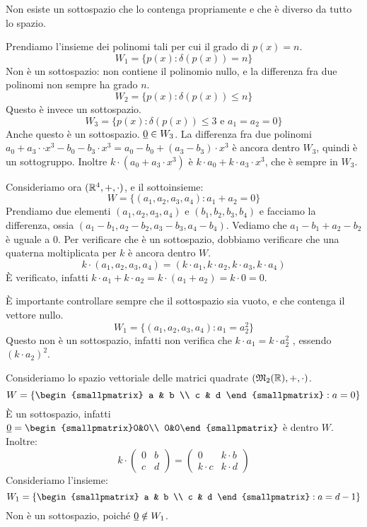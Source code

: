 Non esiste un sottospazio che lo contenga propriamente e che \`e diverso da tutto lo spazio.

Prendiamo l'insieme dei polinomi tali per cui il grado di $p(x) = n$.
\[
W_1 = \{ p(x) : \delta (p(x)) = n \}
\]
Non \`e un sottospazio: non contiene il polinomio nullo, e la differenza fra due polinomi non sempre ha grado $n$.
\[
W_2 = \{ p(x) : \delta (p(x)) \le n \}
\]
Questo \`e invece un sottospazio.
\[
W_3 = \{ p(x) : \delta (p(x)) \le 3 \text{ e } a_1 = a_2 = 0 \}
\]
Anche questo \`e un sottospazio. $\underline{0} \in W_3$. La differenza fra due polinomi $a_0 + a_3 \cdot \cdot x^3 - b_0 - b_3 \cdot x^3 = a_0 - b_0 + (a_3 - b_3) \cdot x^3$ \`e ancora dentro $W_3$, quindi \`e un sottogruppo. Inoltre $k \cdot (a_0 + a_3 \cdot x^3)$ \`e $k \cdot a_0 + k \cdot a_3 \cdot x^3$, che \`e sempre in $W_3$.

Consideriamo ora $(\mathbb{R}^4, +, \cdot)$, e il sottoinsieme:
\[
W = \{ (a_1, a_2, a_3, a_4) : a_1 + a_2 = 0 \}
\]
Prendiamo due elementi $(a_1, a_2, a_3, a_4)$ e $(b_1, b_2, b_3, b_4)$ e facciamo la differenza, ossia $(a_1 - b_1, a_2 - b_2, a_3 - b_3, a_4 - b_4)$. Vediamo che $a_1 - b_1 + a_2 - b_2$ \`e uguale a 0. Per verificare che \`e un sottospazio, dobbiamo verificare che una quaterna moltiplicata per $k$ \`e ancora dentro $W$.
\[
k \cdot (a_1, a_2, a_3, a_4) = (k \cdot a_1, k \cdot a_2, k \cdot a_3, k \cdot a_4)
\]
\`E verificato, infatti $k \cdot a_1 + k \cdot a_2 = k \cdot (a_1 + a_2) = k \cdot 0 = 0$.

\`E importante controllare sempre che il sottospazio sia vuoto, e che contenga il vettore nullo.
\[
W_1 = \{ (a_1, a_2, a_3, a_4) : a_1 = a_2^2 \}
\]
Questo non \`e un sottospazio, infatti non verifica che $k \cdot a_1 = k \cdot a_2^2$ , essendo $(k \cdot a_2)^2$.

Consideriamo lo spazio vettoriale delle matrici quadrate $(\mathfrak{M}_2 (\mathbb{R}), +, \cdot)$.
\[
W = \left\{ 
\begin{smallpmatrix}
a & b  \\
c & d 
\end{smallpmatrix}
: a = 0 \right\}
\]
\`E un sottospazio, infatti $\nullelement = \begin{smallpmatrix}0&0\\ 0&0\end{smallpmatrix} $ \`e dentro $W$. Inoltre:
\[
k \cdot 
\begin{pmatrix}
0 & b \\
c & d
\end{pmatrix}
=
\begin{pmatrix}
0 & k \cdot b \\ 
k \cdot c & k \cdot d
\end{pmatrix}
\]
Consideriamo l'insieme:
\[
W_1 = \left\{
\begin{smallpmatrix}
a & b \\
c & d 
\end{smallpmatrix}
: a = d - 1 \right\} 
\]
Non \`e un sottospazio, poich\'e $\underline{0} \notin W_1$.

